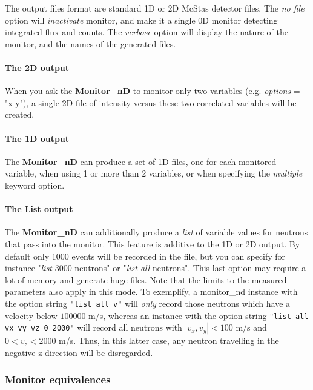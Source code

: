 The output files format are standard 1D or 2D McStas detector files.
The \textit{no file} option will \textit{inactivate} monitor, and make it a
single 0D monitor detecting integrated flux and counts.
The \textit{verbose} option will display the nature of the monitor, and the
names of the generated files.

\paragraph{The 2D output}

When you ask the \textbf{Monitor\_nD} to monitor only two variables (e.g.
\textit{options} = "x y"), a single 2D file of intensity versus these two
correlated variables will be created.

\paragraph{The 1D output}

The \textbf{Monitor\_nD} can produce a set of 1D files, one for each
monitored variable, when using 1 or more than 2 variables, or when
specifying the \textit{multiple} keyword option.

\paragraph{The List output}

The \textbf{Monitor\_nD} can additionally produce a \textit{list} of variable
values for neutrons that pass into the monitor. This feature is additive
to the 1D or 2D output. By default only 1000 events will be recorded in
the file, but you can specify for instance "\textit{list} 3000 neutrons" or
"\textit{list all} neutrons". This last option may require a lot of
memory and generate huge files. Note that the limits to the measured parameters also apply in this mode.
To exemplify, a monitor\_nd instance with the option string \verb+"list all v"+ will \emph{only} record those neutrons which have a velocity below $100000$ m/s,
whereas an instance with the option string \verb+"list all vx vy vz 0 2000"+ will record all neutrons with $|v_x,v_y|<100$ m/s and $0<v_z<2000$ m/s. 
Thus, in this latter case, any neutron travelling in the negative z-direction will be disregarded.

\subsubsection{Monitor equivalences}

